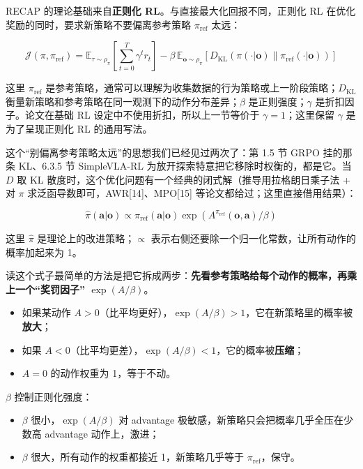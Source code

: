 \documentclass[
  chinese,
]{ctexart}
\providecommand{\tightlist}{%
  \setlength{\itemsep}{0pt}\setlength{\parskip}{0pt}}
\begin{document}
RECAP 的理论基础来自\textbf{正则化 RL}。与直接最大化回报不同，正则化 RL
在优化奖励的同时，要求新策略不要偏离参考策略 \(\pi_\text{ref}\) 太远：

\[
\mathcal{J}(\pi, \pi_\text{ref}) = \mathbb{E}_{\tau \sim \rho_\pi}\left[\sum_{t=0}^T \gamma^t r_t\right] - \beta \, \mathbb{E}_{\mathbf{o} \sim \rho_\pi}\left[D_\text{KL}(\pi(\cdot|\mathbf{o}) \| \pi_\text{ref}(\cdot|\mathbf{o}))\right]
\]

这里 \(\pi_\text{ref}\)
是参考策略，通常可以理解为收集数据的行为策略或上一阶段策略；\(D_\text{KL}\)
衡量新策略和参考策略在同一观测下的动作分布差异；\(\beta\)
是正则强度；\(\gamma\) 是折扣因子。论文在基础 RL
设定中不使用折扣，所以上一节等价于 \(\gamma=1\)；这里保留 \(\gamma\)
是为了呈现正则化 RL 的通用写法。

这个``别偏离参考策略太远''的思想我们已经见过两次了：第 1.5 节 GRPO
挂的那条 KL、6.3.5 节 SimpleVLA-RL
为放开探索特意把它移除时权衡的，都是它。当 \(D\) 取 KL
散度时，这个优化问题有一个经典的闭式解（推导用拉格朗日乘子法 + 对
\(\pi\) 求泛函导数即可，AWR{[}14{]}、MPO{[}15{]}
等论文都给过；这里直接借用结果）：

\[
\hat{\pi}(\mathbf{a}|\mathbf{o}) \propto \pi_\text{ref}(\mathbf{a}|\mathbf{o}) \exp\!\left(A^{\pi_\text{ref}}(\mathbf{o}, \mathbf{a}) / \beta\right)
\]

这里 \(\hat{\pi}\) 是理论上的改进策略；\(\propto\)
表示右侧还要除一个归一化常数，让所有动作的概率加起来为 1。

读这个式子最简单的方法是把它拆成两步：\textbf{先看参考策略给每个动作的概率，再乘上一个``奖罚因子''
\(\exp(A/\beta)\)}。

\begin{itemize}
\tightlist
\item
  如果某动作
  \(A>0\)（比平均更好），\(\exp(A/\beta)>1\)，它在新策略里的概率被\textbf{放大}；
\item
  如果
  \(A<0\)（比平均更差），\(\exp(A/\beta)<1\)，它的概率被\textbf{压缩}；
\item
  \(A=0\) 的动作权重为 1，等于不动。
\end{itemize}

\(\beta\) 控制正则化强度：

\begin{itemize}
\tightlist
\item
  \(\beta\) 很小，\(\exp(A/\beta)\) 对 advantage
  极敏感，新策略只会把概率几乎全压在少数高 advantage 动作上，激进；
\item
  \(\beta\) 很大，所有动作的权重都接近 1，新策略几乎等于
  \(\pi_\text{ref}\)，保守。
\end{itemize}
\end{document}
